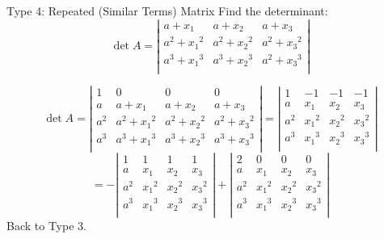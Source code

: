 \documentclass{beamer}
\begin{document}
\begin{frame}{Type 4: Repeated (Similar Terms) Matrix}
Find the determinant:
\begin{equation*}
    \det A=\left| \begin{matrix}
        a+x_1&		a+x_2&		a+x_3\\
        a^2+{x_1}^2&		a^2+{x_2}^2&		a^2+{x_3}^2\\
        a^3+{x_1}^3&		a^3+{x_2}^3&		a^2+{x_3}^3\\
    \end{matrix} \right|
\end{equation*}

\begin{equation*}
    \det A=\left| \begin{matrix}
        1&		0&		0&		0\\
        a&		a+x_1&		a+x_2&		a+x_3\\
        a^2&		a^2+{x_1}^2&		a^2+{x_2}^2&		a^2+{x_3}^2\\
        a^3&		a^3+{x_1}^3&		a^3+{x_2}^3&		a^3+{x_3}^3\\
    \end{matrix} \right|=\left| \begin{matrix}
        1&		-1&		-1&		-1\\
        a&		x_1&		x_2&		x_3\\
        a^2&		{x_1}^2&		{x_2}^2&		{x_3}^2\\
        a^3&		{x_1}^3&		{x_2}^3&		{x_3}^3\\
    \end{matrix} \right|
\end{equation*}
\begin{equation*}
    =-\left| \begin{matrix}
        1&		1&		1&		1\\
        a&		x_1&		x_2&		x_3\\
        a^2&		{x_1}^2&		{x_2}^2&		{x_3}^2\\
        a^3&		{x_1}^3&		{x_2}^3&		{x_3}^3\\
    \end{matrix} \right|
    +\left| \begin{matrix}
        2&		0&		0&		0\\
        a&		x_1&		x_2&		x_3\\
        a^2&		{x_1}^2&		{x_2}^2&		{x_3}^2\\
        a^3&		{x_1}^3&		{x_2}^3&		{x_3}^3\\
    \end{matrix} \right|
\end{equation*}
Back to Type 3.
\end{frame}
\end{document}
